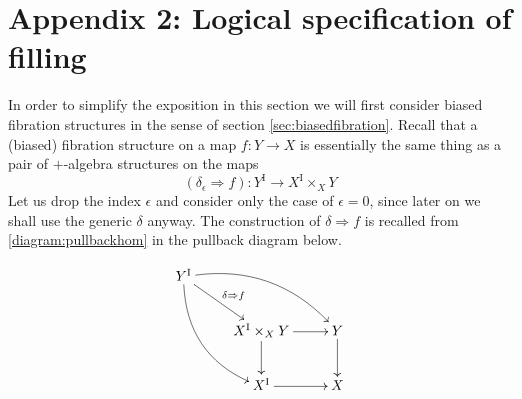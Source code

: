 \documentclass[11pt]{article}
\newcommand{\ra}{\ensuremath{\rightarrow}}
\newcommand{\I}{\ensuremath{\mathrm{I}}}
\theoremstyle{remark}
\theoremstyle{definition}
\begin{document}
\section*{Appendix 2: Logical specification of filling}\label{appendix:logicalspec}


In order to simplify the exposition in this section we will first consider biased fibration structures in the sense of section \ref{sec:biasedfibration}.  Recall that a (biased) fibration structure on a map $f :Y\ra X$ is essentially the same thing as a pair of $+$-algebra structures on the maps
\[
(\delta_\epsilon\Rightarrow\!{f}) : Y^\I \to X^\I \times_{X} Y 
\]
Let us drop the index $\epsilon$ and consider only the case of $\epsilon = 0$, since later on we shall use the generic $\delta$ anyway. The construction of $\delta\!\Rightarrow\!{f}$ is recalled from \eqref{diagram:pullbackhom} in the pullback diagram below.

\begin{equation}\label{diagram:pullbackhom2}
\xymatrix{
Y^\I \ar@/_4ex/ [rdd] \ar[rd]^{\delta\Rightarrow{f}} \ar@/^4ex/ [rrd] && \\
& X^\I \times_{X} Y \ar[d] \ar[r] & Y \ar[d] \\
& X^\I \ar[r] &  X
}
\end{equation}
\end{document}
